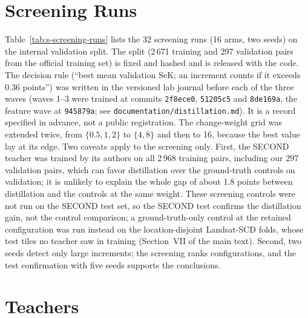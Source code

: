\documentclass[journal,onecolumn,11pt]{IEEEtran}
\begin{document}
\section{Screening Runs}
Table~\ref{tab:s-screening-runs} lists the 32 screening runs (16 arms, two seeds) on the
internal validation split. The split (2\,671 training and 297 validation pairs from the official
training set) is fixed and hashed and is released with the code. The decision rule (``best mean
validation SeK; an increment counts if it exceeds 0.36 points'') was written in the versioned lab journal before each of the three waves (waves 1--3 were trained at commits \texttt{2f8ece0}, \texttt{51205c5} and \texttt{8de169a}, the feature wave at \texttt{945879a}; see \texttt{documentation/distillation.md}). It is a record specified in advance, not a public registration. The change-weight grid was extended twice, from $\{0.5,1,2\}$ to $\{4,8\}$ and then to 16, because the best value lay at its edge. Two caveats apply to the screening only. First, the SECOND teacher was trained
by its authors on all 2\,968 training pairs, including our 297 validation pairs, which can favor
distillation over the ground-truth controls on validation; it is unlikely to explain the whole gap
of about 1.8 points between distillation and the controls at the same weight. These screening
controls were not run on the SECOND test set, so the SECOND test confirms the distillation gain, not
the control comparison; a ground-truth-only control at the retained configuration was run instead
on the location-disjoint Landsat-SCD folds, whose test tiles no teacher saw in training (Section~VII
of the main text). Second, two seeds detect only large increments; the screening
ranks configurations, and the test confirmation with five seeds supports the conclusions.



\section{Teachers}
\end{document}
